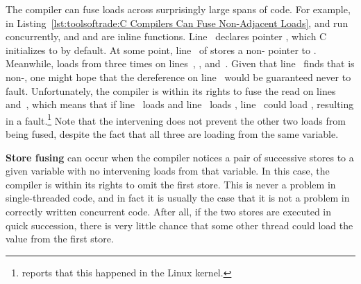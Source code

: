 \begin{fcvref}
The compiler can fuse loads across surprisingly large spans of code.
For example, in
Listing~\ref{lst:toolsoftrade:C Compilers Can Fuse Non-Adjacent Loads},
 and  run concurrently, and  and
 are inline functions.
Line~ declares pointer , which C initializes to 
by default.
At some point, line~ of  stores a non-
pointer to .
Meanwhile,  loads from  three times on
lines~, , and~.
Given that line~ finds that  is non-, one might
hope that the dereference on line~ would be guaranteed never
to fault.
Unfortunately, the compiler is within its rights to fuse the read on
lines~ and~, which means that if line~
loads  and line~ loads , line~
could load , resulting in a fault.\footnote{
	 reports that this happened in the Linux kernel.}
Note that the intervening  does not prevent the other
two loads from being fused, despite the fact that all three are loading
from the same variable.
\end{fcvref}

\QuickQuizEnd

{\bf Store fusing} can occur when the compiler notices a pair of successive
stores to a given variable with no intervening loads from that variable.
In this case, the compiler is within its rights to omit the first store.
This is never a problem in single-threaded code, and in fact it is usually
the case that it is not a problem in correctly written concurrent code.
After all, if the two stores are executed in quick succession, there is
very little chance that some other thread could load the value from the
first store.

